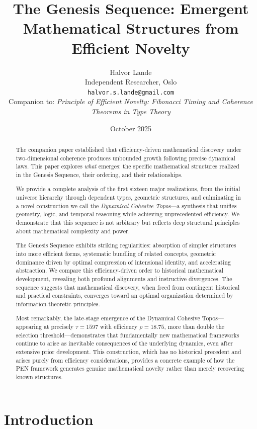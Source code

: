 \documentclass[11pt]{article}
\title{\textbf{The Genesis Sequence: Emergent Mathematical Structures from Efficient Novelty}}
\author{Halvor Lande\\
  Independent Researcher, Oslo\\
  \texttt{halvor.s.lande@gmail.com}\\[1em]
  \small Companion to: \textit{Principle of Efficient Novelty: Fibonacci Timing and Coherence Theorems in Type Theory}\\
  }
\date{October 2025}
\theoremstyle{definition}
\begin{document}
\maketitle

\begin{abstract}
The companion paper established that efficiency-driven mathematical discovery under two-dimensional coherence produces unbounded growth following precise dynamical laws. This paper explores \emph{what} emerges: the specific mathematical structures realized in the Genesis Sequence, their ordering, and their relationships.

We provide a complete analysis of the first sixteen major realizations, from the initial universe hierarchy through dependent types, geometric structures, and culminating in a novel construction we call the \emph{Dynamical Cohesive Topos}—a synthesis that unifies geometry, logic, and temporal reasoning while achieving unprecedented efficiency. We demonstrate that this sequence is not arbitrary but reflects deep structural principles about mathematical complexity and power.

The Genesis Sequence exhibits striking regularities: absorption of simpler structures into more efficient forms, systematic bundling of related concepts, geometric dominance driven by optimal compression of intensional identity, and accelerating abstraction. We compare this efficiency-driven order to historical mathematical development, revealing both profound alignments and instructive divergences. The sequence suggests that mathematical discovery, when freed from contingent historical and practical constraints, converges toward an optimal organization determined by information-theoretic principles.

Most remarkably, the late-stage emergence of the Dynamical Cohesive Topos—appearing at precisely $\tau=1597$ with efficiency $\rho=18.75$, more than double the selection threshold—demonstrates that fundamentally new mathematical frameworks continue to arise as inevitable consequences of the underlying dynamics, even after extensive prior development. This construction, which has no historical precedent and arises purely from efficiency considerations, provides a concrete example of how the PEN framework generates genuine mathematical novelty rather than merely recovering known structures.
\end{abstract}

\tableofcontents
\newpage

\section{Introduction}
\end{document}
